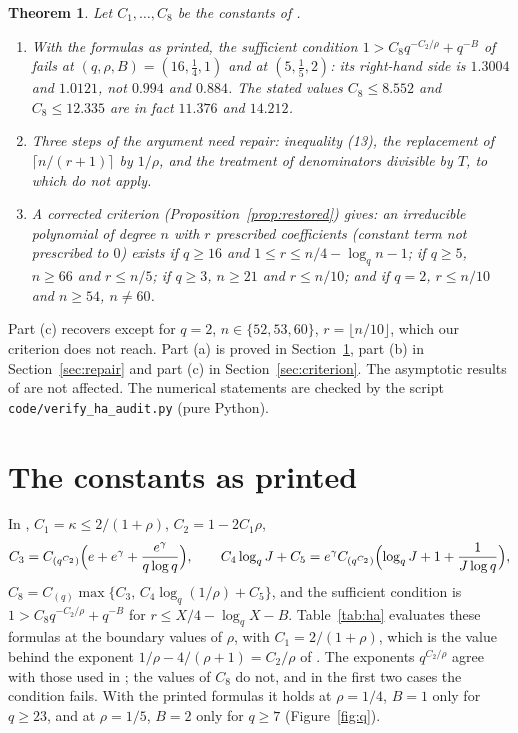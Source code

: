 \documentclass[11pt,a4paper]{amsart}
\newtheorem{theorem}{Theorem}[section]
\theoremstyle{remark}
\numberwithin{equation}{section}
\begin{document}
\begin{theorem}\label{thm:Ha}
Let $C_1,\dots,C_8$ be the constants of \cite[\S\S3--4]{Ha}.
\begin{enumerate}
\item[(a)] With the formulas as printed, the sufficient condition $1>C_8q^{-C_2/\rho}+q^{-B}$ of \cite[\S4]{Ha} fails
at $(q,\rho,B)=(16,\frac14,1)$ and at $(5,\frac15,2)$: its right-hand side is $1.3004$ and $1.0121$, not $0.994$ and
$0.884$. The stated values $C_8\le8.552$ and $C_8\le12.335$ are in fact $11.376$ and $14.212$.
\item[(b)] Three steps of the argument need repair: inequality \textup{(13)}, the replacement of
$\lceil n/(r+1)\rceil$ by $1/\rho$, and the treatment of denominators divisible by $T$, to which
\cite[Lemmas~2.6, 2.7]{Ha} do not apply.
\item[(c)] A corrected criterion (Proposition~\ref{prop:restored}) gives: an irreducible polynomial of degree $n$ with
$r$ prescribed coefficients (constant term not prescribed to $0$) exists if $q\ge16$ and
$1\le r\le n/4-\log_qn-1$; if $q\ge5$, $n\ge66$ and $r\le n/5$; if $q\ge3$, $n\ge21$ and $r\le n/10$; and if $q=2$,
$r\le n/10$ and $n\ge54$, $n\ne60$.
\end{enumerate}
\end{theorem}

Part (c) recovers \cite[Theorem~1.3]{Ha} except for $q=2$, $n\in\{52,53,60\}$, $r=\lfloor n/10\rfloor$, which our criterion does not
reach. Part (a) is proved in Section~\ref{sec:printed}, part (b) in Section~\ref{sec:repair} and part (c) in
Section~\ref{sec:criterion}. The asymptotic results of \cite{Ha} are not affected. The numerical statements are
checked by the script \texttt{code/verify\_ha\_audit.py} (pure Python).

\section{The constants as printed}\label{sec:printed}
In \cite{Ha}, $C_1=\kappa\le2/(1+\rho)$, $C_2=1-2C_1\rho$,
\[
C_3=C_{(q^{C_2})}\Bigl(e+e^\gamma+\frac{e^\gamma}{q\log q}\Bigr),\qquad
C_4\log_qJ+C_5=e^\gamma C_{(q^{C_2})}\Bigl(\log_qJ+1+\frac1{J\log q}\Bigr),
\]
$C_8=C_{(q)}\max\{C_3,\,C_4\log_q(1/\rho)+C_5\}$, and the sufficient condition is
$1>C_8q^{-C_2/\rho}+q^{-B}$ for $r\le X/4-\log_qX-B$. Table~\ref{tab:ha} evaluates these formulas at the boundary
values of $\rho$, with $C_1=2/(1+\rho)$, which is the value behind the exponent $1/\rho-4/(\rho+1)=C_2/\rho$ of
\cite[Theorem~1.1]{Ha}. The exponents $q^{C_2/\rho}$ agree with those used in \cite{Ha}; the values of $C_8$ do
not, and in the first two cases the condition fails. With the printed formulas it holds at $\rho=1/4$, $B=1$ only for
$q\ge23$, and at $\rho=1/5$, $B=2$ only for $q\ge7$ (Figure~\ref{fig:q}).
\end{document}
